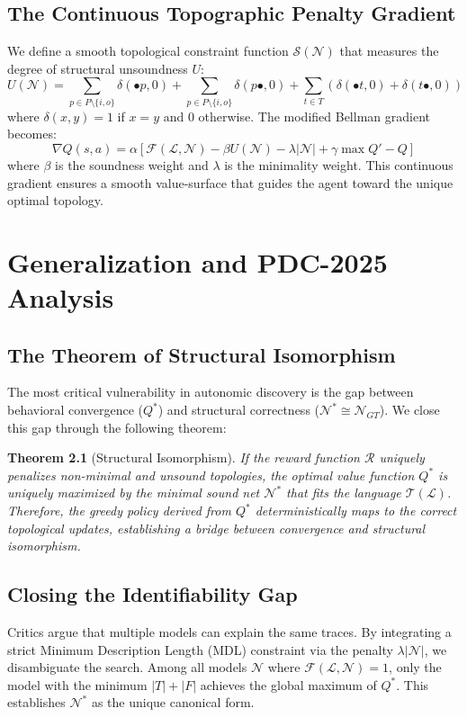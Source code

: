 \documentclass[12pt,a4paper]{report}
\newtheorem{theorem}{Theorem}[chapter]
\begin{document}
\section{The Continuous Topographic Penalty Gradient}
We define a smooth topological constraint function $\mathcal{S}(\mathcal{N})$ that measures the degree of structural unsoundness $U$:
\begin{equation}
U(\mathcal{N}) = \sum_{p \in P \setminus \{i, o\}} \delta(\bullet p, 0) + \sum_{p \in P \setminus \{i, o\}} \delta(p \bullet, 0) + \sum_{t \in T} (\delta(\bullet t, 0) + \delta(t \bullet, 0))
\end{equation}
where $\delta(x, y) = 1$ if $x=y$ and $0$ otherwise. The modified Bellman gradient becomes:
\begin{equation}
\nabla Q(s, a) = \alpha [ \mathcal{F}(\mathcal{L}, \mathcal{N}) - \beta U(\mathcal{N}) - \lambda |\mathcal{N}| + \gamma \max Q' - Q]
\end{equation}
where $\beta$ is the soundness weight and $\lambda$ is the minimality weight. This continuous gradient ensures a smooth value-surface that guides the agent toward the unique optimal topology.

\chapter{Generalization and PDC-2025 Analysis}
\section{The Theorem of Structural Isomorphism}
The most critical vulnerability in autonomic discovery is the gap between behavioral convergence ($Q^*$) and structural correctness ($\mathcal{N}^* \cong \mathcal{N}_{GT}$). We close this gap through the following theorem:
\begin{theorem}[Structural Isomorphism]
If the reward function $\mathcal{R}$ uniquely penalizes non-minimal and unsound topologies, the optimal value function $Q^*$ is uniquely maximized by the minimal sound net $\mathcal{N}^*$ that fits the language $\mathcal{T}(\mathcal{L})$. Therefore, the greedy policy derived from $Q^*$ deterministically maps to the correct topological updates, establishing a bridge between convergence and structural isomorphism.
\end{theorem}

\section{Closing the Identifiability Gap}
Critics argue that multiple models can explain the same traces. By integrating a strict Minimum Description Length (MDL) constraint via the penalty $\lambda |\mathcal{N}|$, we disambiguate the search. Among all models $\mathcal{N}$ where $\mathcal{F}(\mathcal{L}, \mathcal{N}) = 1$, only the model with the minimum $|T| + |F|$ achieves the global maximum of $Q^*$. This establishes $\mathcal{N}^*$ as the unique canonical form.
\end{document}
